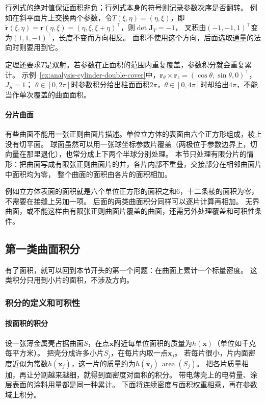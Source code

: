 行列式的绝对值保证面积非负；行列式本身的符号则记录参数次序是否翻转。
例如在斜平面片上交换两个参数，令$T(\xi,\eta)=(\eta,\xi)$，即$\widetilde{\bm r}(\xi,\eta)=\bm r(\eta,\xi)=(\eta,\xi,\xi+\eta)^\top$，则$\det\bm J_T=-1$，
叉积由$(-1,-1,1)^\top$变为$(1,1,-1)^\top$，长度不变而方向相反。
面积不使用这个方向，后面选取通量的法向时则要用到它。

定理还要求$T$是双射。若参数在正面积的范围内重复覆盖，参数积分就会重复累计。
示例~\ref{ex:analysis-cylinder-double-cover}中，$\bm r_\theta\times\bm r_z=(\cos\theta,\sin\theta,0)^\top$，$J_S=1$；
$\theta\in[0,2\pi]$时参数积分给出柱面面积$2\pi$，$\theta\in[0,4\pi]$时却给出$4\pi$，不能当作单次覆盖的曲面面积。

\paragraph{分片曲面}

有些曲面不能用一张正则曲面片描述。单位立方体的表面由六个正方形组成，棱上没有切平面。
球面虽然可以用一张球坐标参数片覆盖（两极位于参数边界上，切向量在那里退化），也常分成上下两个半球分别处理。
本节只处理有限分片的情形：把曲面写成有限张正则曲面片的并，各片内部不重叠，交接部分在相邻曲面片中面积均为零，
整个曲面的面积由各片的面积相加。

例如立方体表面的面积就是六个单位正方形的面积之和$6$，十二条棱的面积为零，不需要在接缝上另加一项。
后面的两类曲面积分同样可以逐片计算再相加。
无界曲面，或不能这样由有限张正则曲面片覆盖的曲面，还需另外处理覆盖和可积性条件。

\subsection{第一类曲面积分}

有了面积，就可以回到本节开头的第一个问题：在曲面上累计一个标量密度。
这类积分只用到小片的面积，不涉及方向。

\subsubsection{积分的定义和可积性}

\paragraph{按面积的积分}

设一张薄金属壳占据曲面$S$，在点$\bm x$附近每单位面积的质量为$h(\bm x)$（单位如千克每平方米）。
把壳分成许多小片$S_j$，在每片内取一点$\bm x_j$。
若每片很小，片内面密度近似为常数$h(\bm x_j)$，这一片的质量约为$h(\bm x_j)\,\operatorname{area}(S_j)$。
把各片质量相加，再让分割越来越细，就得到面密度对面积的积分。
带电薄壳上的电荷量、涂层表面的涂料用量都是同一种累计。
下面将连续密度与面积权重相乘，再在参数域上积分。

